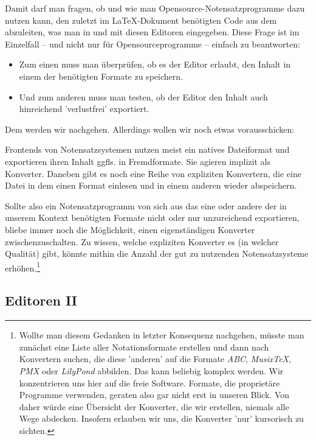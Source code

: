 \documentclass[
  DIV=calc,
  BCOR=5mm,
  12pt,
  headings=small,
  twoside,
  abstract=true,
  toc=bib,
  xcolor=dvipsnames,
  english,ngerman]{scrartcl}
\begin{document}
Damit darf man fragen, ob und wie man Opensource-Notensatzprogramme dazu nutzen
kann, den zuletzt im \LaTeX-Dokument benötigten Code aus dem abzuleiten, was man
in und mit diesen Editoren eingegeben. Diese Frage ist im Einzelfall -- und
nicht nur für Opensourceprogramme -- einfach zu beantworten:

\begin{itemize}
\item Zum einen muss man überprüfen, ob es der Editor erlaubt, den Inhalt in
einem der benötigten Formate zu speichern.
\item Und zum anderen muss man testen, ob der Editor den Inhalt auch
hinreichend 'verlustfrei' exportiert.
\end{itemize}

Dem werden wir nachgehen. Allerdings wollen wir noch etwas vorausschicken:

Frontends von Notensatzsystemen nutzen meist ein natives Dateiformat und
exportieren ihren Inhalt ggfls. in Fremdformate. Sie agieren implizit als
Konverter. Daneben gibt es noch eine Reihe von expliziten Konvertern, die eine
Datei in dem einen Format einlesen und in einem anderen wieder abspeichern.

Sollte also ein Notensatzprogramm von sich aus das eine oder andere der in
unserem Kontext benötigten Formate nicht oder nur unzureichend exportieren,
bliebe immer noch die Möglichkeit, einen eigenständigen Konverter
zwischenzuschalten. Zu wissen, welche expliziten Konverter es (in welcher
Qualität) gibt, könnte mithin die Anzahl der gut zu nutzenden Notensatzsysteme
erhöhen.\footnote{Wollte man diesem Gedanken in letzter Konsequenz nachgehen,
müsste man zunächst eine Liste aller Notationsformate erstellen und dann nach
Konvertern suchen, die diese 'anderen' auf die Formate \textit{ABC},
\textit{Musix\TeX}, \textit{PMX} oder \textit{LilyPond} abbilden. Das kann beliebig
komplex werden. Wir konzentrieren uns hier auf die freie Software. Formate, die
proprietäre Programme verwenden, geraten also gar nicht erst in unseren Blick.
Von daher würde eine Übersicht der Konverter, die wir erstellen, niemals alle
Wege abdecken. Insofern erlauben wir uns, die Konverter 'nur' kursorisch zu
sichten.}








\subsection{Editoren II}
\end{document}
